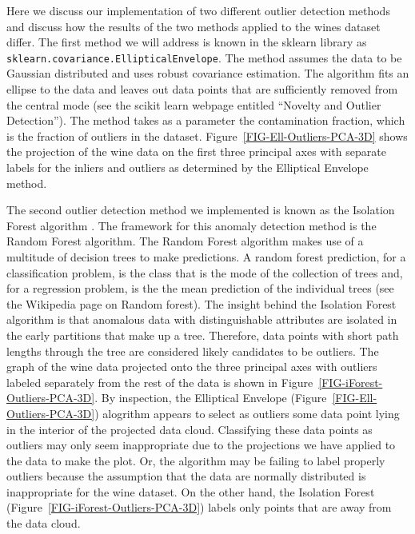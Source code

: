 \documentclass[12pt,preprint]{aastex61}
\begin{document}
 Here we discuss our implementation of two different outlier detection
methods and discuss how the results of the two methods applied to the
wines dataset differ. The first method we will address is known in the
sklearn library as \texttt{sklearn.covariance.EllipticalEnvelope}. The method
assumes the data to be Gaussian distributed and uses robust covariance estimation. 
The algorithm fits an ellipse to the data and leaves out data points that are
sufficiently removed from the central mode (see the scikit learn webpage entitled
``Novelty and Outlier Detection''). The method takes as a parameter the
contamination fraction, which is the fraction of outliers in the dataset. Figure~\ref{FIG-Ell-Outliers-PCA-3D} shows the projection
of the wine data on the first three principal axes with separate labels for
the inliers and outliers as determined by the Elliptical Envelope method.

The second outlier detection method we implemented is known as the
Isolation Forest algorithm \citep{Liu_etal_2008}. The framework for this anomaly
detection method is the Random Forest algorithm. The Random Forest
algorithm makes use of a multitude of decision trees to make
predictions. A random forest prediction, for a classification
problem, is the class that is the mode of the collection of trees and,
for a regression problem, is the the mean prediction of the
individual trees (see the Wikipedia page on Random forest). The insight behind the Isolation Forest algorithm is
that anomalous data with distinguishable attributes are isolated in
the early partitions that make up a tree. Therefore, data points with
short path lengths through the tree are considered likely candidates
to be outliers. The graph of the wine data projected onto the three principal
axes with outliers labeled separately from the rest of the data is shown in
Figure~\ref{FIG-iForest-Outliers-PCA-3D}. By inspection,
the Elliptical Envelope (Figure~\ref{FIG-Ell-Outliers-PCA-3D}) alogrithm
appears to select as outliers some data point lying in the interior of the
projected data cloud. Classifying these data points as outliers may only seem
inappropriate due to the projections we have applied to the data to make the plot. Or, the algorithm
may be failing to label properly outliers because the assumption that the data
are normally distributed is inappropriate for the wine dataset. On the other hand, the
Isolation Forest (Figure~\ref{FIG-iForest-Outliers-PCA-3D}) labels only points that are
away from the data cloud. 
\end{document}
